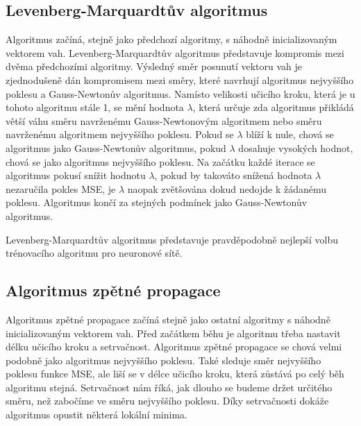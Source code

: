 \documentclass[11pt,twoside,a4paper]{book}
\begin{document}
\subsection{Levenberg-Marquardtův algoritmus}
Algoritmus začíná, stejně jako předchozí algoritmy, s náhodně inicializovaným vektorem vah. Levenberg-Marquardtův algoritmus představuje kompromis mezi dvěma předchozími algoritmy. Výsledný směr posunutí vektoru vah je zjednodušeně dán kompromisem mezi směry, které navrhují algoritmus nejvyššího poklesu a Gauss-Newtonův algoritmus.  Namísto velikosti učicího kroku, která je u tohoto algoritmu stále 1, se mění hodnota \begin{math}\lambda\end{math}, která určuje zda algoritmus přikládá větší váhu směru navrženému Gauss-Newtonovým algoritmem nebo směru navrženému algoritmem nejvyššího poklesu. Pokud se \begin{math}\lambda\end{math} blíží k nule, chová se algoritmus jako Gauss-Newtonův algoritmus, pokud \begin{math}\lambda\end{math} dosahuje vysokých hodnot, chová se jako algoritmus nejvyššího poklesu. Na začátku každé iterace se algoritmus pokusí snížit hodnotu \begin{math}\lambda\end{math}, pokud by takováto snížená hodnota \begin{math}\lambda\end{math} nezaručila pokles MSE, je \begin{math}\lambda\end{math} naopak zvětšována dokud nedojde k žádanému poklesu. Algoritmus končí za stejných podmínek jako Gauss-Newtonův algoritmus.\cite{nndocumentation, learningmachines} 

Levenberg-Marquardtův algoritmus představuje pravděpodobně nejlepší volbu trénovacího algoritmu pro neuronové sítě.

\subsection{Algoritmus zpětné propagace}
Algoritmus zpětné propagace začíná stejně jako ostatní algoritmy s náhodně inicializovaným vektorem vah. Před začátkem běhu je algoritmu třeba nastavit délku učicího kroku a setrvačnost. Algoritmus zpětné propagace se chová velmi podobně jako algoritmus nejvyššího poklesu. Také sleduje směr nejvyššího poklesu funkce MSE, ale liší se v délce učicího kroku, která zůstává po celý běh algoritmu stejná. Setrvačnost nám říká, jak dlouho se budeme držet určitého směru, než zabočíme ve směru nejvyššího poklesu. Díky setrvačnosti dokáže algoritmus opustit některá lokální minima. 
\end{document}
